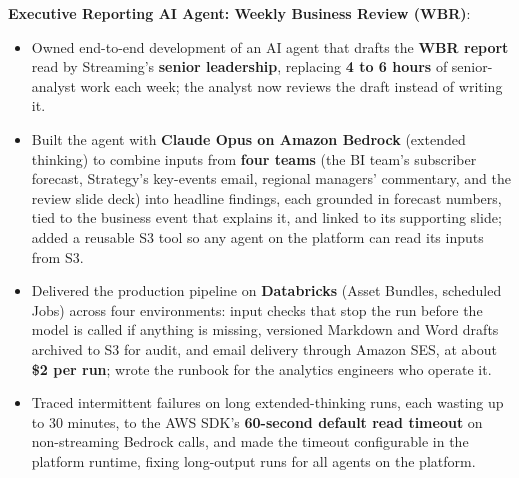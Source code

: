 \documentclass[letterpaper,9pt]{extarticle}
\newcommand{\resumeItem}[2]{
  \item\small{
    \textbf{#1}{:} 
  \begin{itemize}[label=\textbullet, leftmargin=8pt, itemsep=2pt]
      #2
    \end{itemize}
    }
}
\begin{document}
            \resumeItem{Executive Reporting AI Agent: Weekly Business Review (WBR)}
            {
                \item Owned end-to-end development of an AI agent that drafts the \textbf{WBR report} read by Streaming's \textbf{senior leadership}, replacing \textbf{4 to 6 hours} of senior-analyst work each week; the analyst now reviews the draft instead of writing it.

                \item Built the agent with \textbf{Claude Opus on Amazon Bedrock} (extended thinking) to combine inputs from \textbf{four teams} (the BI team's subscriber forecast, Strategy's key-events email, regional managers' commentary, and the review slide deck) into headline findings, each grounded in forecast numbers, tied to the business event that explains it, and linked to its supporting slide; added a reusable S3 tool so any agent on the platform can read its inputs from S3.

                \item Delivered the production pipeline on \textbf{Databricks} (Asset Bundles, scheduled Jobs) across four environments: input checks that stop the run before the model is called if anything is missing, versioned Markdown and Word drafts archived to S3 for audit, and email delivery through Amazon SES, at about \textbf{\$2 per run}; wrote the runbook for the analytics engineers who operate it.

                \item Traced intermittent failures on long extended-thinking runs, each wasting up to 30 minutes, to the AWS SDK's \textbf{60-second default read timeout} on non-streaming Bedrock calls, and made the timeout configurable in the platform runtime, fixing long-output runs for all agents on the platform.
            }
            \vspace{2pt}
\end{document}
